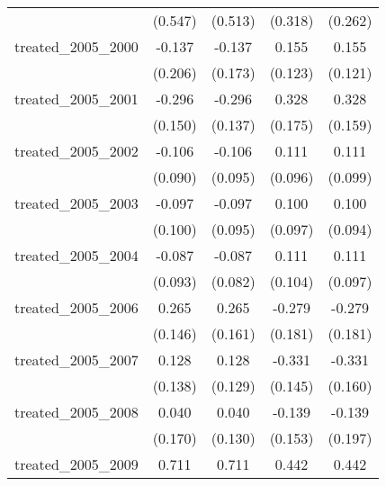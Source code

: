 {\begin{tabular}{l*{4}{c}}
            &     (0.547)         &     (0.513)         &     (0.318)         &     (0.262)         \\
[1em]
treated\_2005\_2000&      -0.137         &      -0.137         &       0.155         &       0.155         \\
            &     (0.206)         &     (0.173)         &     (0.123)         &     (0.121)         \\
[1em]
treated\_2005\_2001&      -0.296\sym{*}  &      -0.296\sym{*}  &       0.328         &       0.328\sym{*}  \\
            &     (0.150)         &     (0.137)         &     (0.175)         &     (0.159)         \\
[1em]
treated\_2005\_2002&      -0.106         &      -0.106         &       0.111         &       0.111         \\
            &     (0.090)         &     (0.095)         &     (0.096)         &     (0.099)         \\
[1em]
treated\_2005\_2003&      -0.097         &      -0.097         &       0.100         &       0.100         \\
            &     (0.100)         &     (0.095)         &     (0.097)         &     (0.094)         \\
[1em]
treated\_2005\_2004&      -0.087         &      -0.087         &       0.111         &       0.111         \\
            &     (0.093)         &     (0.082)         &     (0.104)         &     (0.097)         \\
[1em]
treated\_2005\_2006&       0.265         &       0.265         &      -0.279         &      -0.279         \\
            &     (0.146)         &     (0.161)         &     (0.181)         &     (0.181)         \\
[1em]
treated\_2005\_2007&       0.128         &       0.128         &      -0.331\sym{*}  &      -0.331\sym{*}  \\
            &     (0.138)         &     (0.129)         &     (0.145)         &     (0.160)         \\
[1em]
treated\_2005\_2008&       0.040         &       0.040         &      -0.139         &      -0.139         \\
            &     (0.170)         &     (0.130)         &     (0.153)         &     (0.197)         \\
[1em]
treated\_2005\_2009&       0.711\sym{*}  &       0.711\sym{*}  &       0.442         &       0.442\sym{*}  \\

\end{tabular}}
